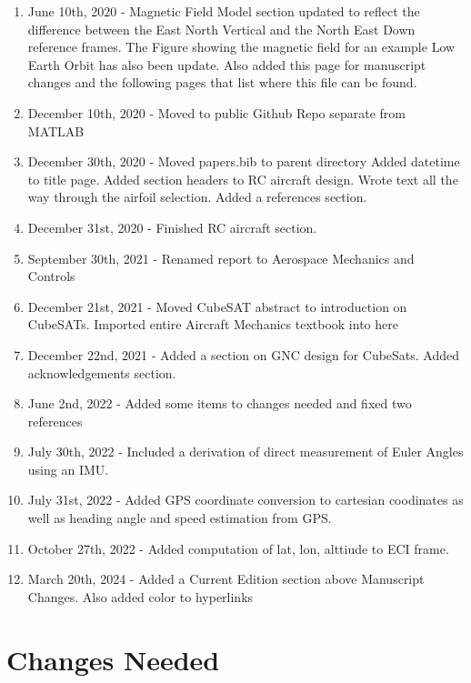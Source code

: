 \documentclass{article}
\begin{document}
\begin{enumerate}[itemsep=-5pt]
\item June 10th, 2020 - Magnetic Field Model section updated to
  reflect the difference between the East North Vertical and the North
  East Down reference frames. The Figure showing the magnetic field
  for an example Low Earth Orbit has also been update. Also added this
  page for manuscript changes and the following pages that list where
  this file can be found.
\item December 10th, 2020 - Moved to public Github Repo separate from
  MATLAB
\item December 30th, 2020 - Moved papers.bib to parent directory Added
  datetime to title page. Added  section headers to RC aircraft
  design. Wrote text all the way through the airfoil selection. Added
  a references section.
\item December 31st, 2020 - Finished RC aircraft section.
\item September 30th, 2021 - Renamed report to Aerospace Mechanics and
  Controls
\item December 21st, 2021 - Moved CubeSAT abstract to introduction on
  CubeSATs. Imported entire Aircraft Mechanics textbook into here
\item December 22nd, 2021 - Added a section on GNC design for
  CubeSats. Added acknowledgements section.
\item June 2nd, 2022 - Added some items to changes needed and fixed
  two references
\item July 30th, 2022 - Included a derivation of direct measurement of Euler Angles using an IMU.
\item July 31st, 2022 - Added GPS coordinate conversion to cartesian coodinates as well as heading angle and speed estimation from GPS.
\item October 27th, 2022 - Added computation of lat, lon, alttiude to ECI frame.
\item March 20th, 2024 - Added a Current Edition section above Manuscript Changes. Also added color to hyperlinks
\end{enumerate}

\section*{Changes Needed}
\end{document}
